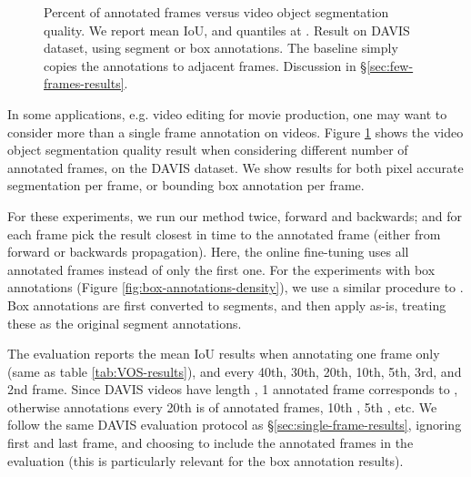 \documentclass[10pt,twocolumn,letterpaper]{article}
\begin{document}
\begin{figure}
\hspace*{\fill}\hspace*{\fill}

\hspace*{\fill}\hspace*{\fill}
\caption{\label{fig:annotation-density}Percent of annotated frames versus
video object segmentation quality. We report mean IoU, and quantiles
at . Result on
DAVIS dataset, using segment or box annotations. The baseline simply
copies the annotations to adjacent frames.
Discussion in \S\ref{sec:few-frames-results}.
}\vspace{-1em}
\end{figure}

In some applications, e.g. video editing for movie production, one may want to consider more than a single frame annotation on videos. Figure \ref{fig:annotation-density} shows the video object segmentation quality
result when considering different number of annotated frames, on the DAVIS dataset. We show results for both pixel accurate segmentation per frame, or bounding box annotation per frame.

For these experiments, we run our method twice, forward and backwards; and for each frame pick the result closest in time to the annotated frame (either from forward or backwards propagation). Here,
the online fine-tuning uses all annotated frames instead of only the first one. For the experiments with box annotations (Figure \ref{fig:box-annotations-density}), we use a similar procedure to .
Box annotations are first converted to segments, and then apply  as-is, treating these as the original segment annotations.

The evaluation reports the mean IoU results when annotating one frame only (same as table \ref{tab:VOS-results}), and every 40th, 30th, 20th, 10th, 5th, 3rd, and 2nd frame. Since DAVIS videos have length , 1 annotated frame corresponds to , otherwise annotations every 20th is  of annotated frames, 10th , 5th , etc. We follow the same DAVIS evaluation protocol as
\S\ref{sec:single-frame-results}, ignoring first and last frame, and choosing to include the annotated frames in the evaluation (this is particularly relevant for the box annotation results).
\end{document}
